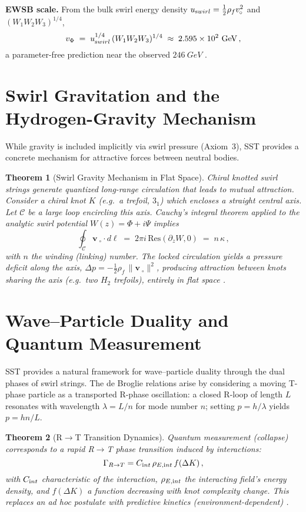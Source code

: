 \documentclass[11pt]{article}
\newtheorem{theorem}{Theorem}[section]
\begin{document}
	\textbf{EWSB scale.} From the bulk swirl energy density $u_{\textrm swirl} = \tfrac{1}{2}\rho_f v_{\!\!\;\circ}^2$ and $(W_1W_2W_3)^{1/4}$,
	\[
		v_\Phi \;=\; u_{\textrm swirl}^{1/4}\,(W_1 W_2 W_3)^{1/4} \;\approx\; 2.595\times10^2~\si{GeV}\,,
	\]
	a parameter-free prediction near the observed $\SI{246}{GeV}$ \cite{Iskandarani2025Canon034}.

	\section{Swirl Gravitation and the Hydrogen-Gravity Mechanism}
	While gravity is included implicitly via swirl pressure (Axiom~3), SST provides a concrete mechanism for attractive forces between neutral bodies.

	\begin{theorem}[Swirl Gravity Mechanism in Flat Space]
		Chiral knotted swirl strings generate quantized long-range circulation that leads to mutual attraction. Consider a chiral knot $K$ (e.g.\ a trefoil, $3_1$) which encloses a straight central axis. Let $\mathcal{C}$ be a large loop encircling this axis. Cauchy’s integral theorem applied to the analytic swirl potential $W(z)=\Phi+i\Psi$ implies
		\[
			\oint_{\mathcal{C}} \mathbf{v}_{\!\!\;\circ}\cdot d\boldsymbol{\ell} \;=\; 2\pi i\,\mathrm{Res}(\partial_z W,0) \;=\; n\,\kappa\,,
		\]
		with $n$ the winding (linking) number. The locked circulation yields a pressure deficit along the axis, $\Delta p = -\tfrac{1}{2}\rho_f\,\|\mathbf{v}_{\!\!\;\circ}\|^2$, producing attraction between knots sharing the axis (e.g.\ two $H_2$ trefoils), entirely in flat space \cite{Iskandarani2025Hydrogen}.
	\end{theorem}

	\section{Wave--Particle Duality and Quantum Measurement}
	SST provides a natural framework for wave--particle duality through the dual phases of swirl strings. The de Broglie relations arise by considering a moving T-phase particle as a transported R-phase oscillation: a closed R-loop of length $L$ resonates with wavelength $\lambda = L/n$ for mode number $n$; setting $p = h/\lambda$ yields $p = h n/L$.

	\begin{theorem}[R$\to$T Transition Dynamics]
		Quantum measurement (collapse) corresponds to a rapid R$\to$T phase transition induced by interactions:
		\[
			\Gamma_{R\to T} = C_{\textrm int}\,\rho_{E,\textrm int}\,f(\Delta K)\,,
		\]
		with $C_{\textrm int}$ characteristic of the interaction, $\rho_{E,\textrm int}$ the interacting field’s energy density, and $f(\Delta K)$ a function decreasing with knot complexity change. This replaces an ad hoc postulate with predictive kinetics (environment-dependent) \cite{Zurek2003,Iskandarani2025DoubleSlit}.
	\end{theorem}
\end{document}
